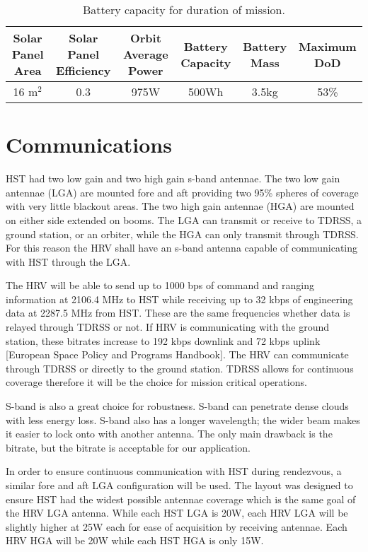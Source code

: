 \documentclass[onecolumn,10pt]{jhwhw}
\begin{document}
\begin{table}[h]
\begin{center}
\begin{tabular}{c c c c c c}
\toprule
Solar Panel Area &  Solar Panel Efficiency &  Orbit Average Power &  Battery Capacity &  Battery Mass &  Maximum DoD \\
\midrule
16 m$^2$ & 0.3 & 975W & 500Wh & 3.5kg & 53\% \\
\bottomrule
\end{tabular}
\end{center}
\caption{Battery capacity for duration of mission.}
\end{table}


\chapter{Communications}
HST had two low gain and two high gain s-band antennae. The two low gain antennae (LGA) are mounted fore and aft providing two 95\% spheres of coverage with very little blackout areas. The two high gain antennae (HGA) are mounted on either side extended on booms. The LGA can transmit or receive to TDRSS, a ground station, or an orbiter, while the HGA can only transmit through TDRSS. For this reason the HRV shall have an s-band antenna capable of communicating with HST through the LGA.

The HRV will be able to send up to 1000 bps of command and ranging information at 2106.4 MHz to HST while receiving up to 32 kbps of engineering data at 2287.5 MHz from HST. These are the same frequencies whether data is relayed through TDRSS or not. If HRV is communicating with the ground station, these bitrates increase to 192 kbps downlink and 72 kbps uplink [European Space Policy and Programs Handbook]. The HRV can communicate through TDRSS or directly to the ground station. TDRSS allows for continuous coverage therefore it will be the choice for mission critical operations.

S-band is also a great choice for robustness. S-band can penetrate dense clouds with less energy loss. S-band also has a longer wavelength; the wider beam makes it easier to lock onto with another antenna. The only main drawback is the bitrate, but the bitrate is acceptable for our application.

In order to ensure continuous communication with HST during rendezvous, a similar fore and aft LGA configuration will be used. The layout was designed to ensure HST had the widest possible antennae coverage which is the same goal of the HRV LGA antenna. While each HST LGA is 20W, each HRV LGA will be slightly higher at 25W each for ease of acquisition by receiving antennae. Each HRV HGA will be 20W while each HST HGA is only 15W.
\end{document}
